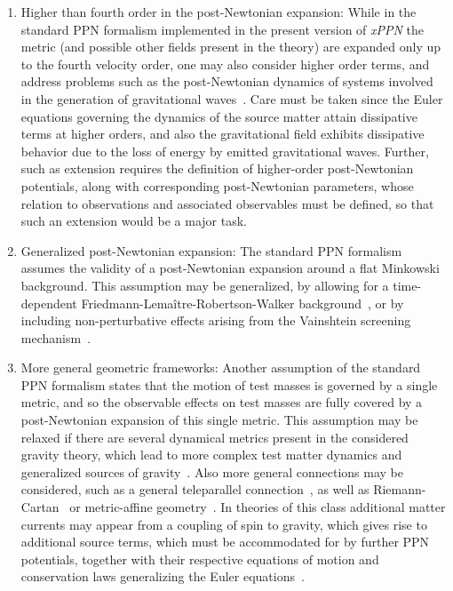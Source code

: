 \documentclass[notitlepage,a4paper,aps,prd,onecolumn,superscriptaddress,nofootinbib,groupedaddress,longbibliography]{revtex4-1}
\newcommand{\xPPN}{\emph{xPPN}}
\begin{document}
\begin{enumerate}
\item
Higher than fourth order in the post-Newtonian expansion: While in the standard PPN formalism implemented in the present version of \xPPN{} the metric (and possible other fields present in the theory) are expanded only up to the fourth velocity order, one may also consider higher order terms, and address problems such as the post-Newtonian dynamics of systems involved in the generation of gravitational waves~\cite{Blanchet:2013haa,Will:2018bme}. Care must be taken since the Euler equations governing the dynamics of the source matter attain dissipative terms at higher orders, and also the gravitational field exhibits dissipative behavior due to the loss of energy by emitted gravitational waves. Further, such as extension requires the definition of higher-order post-Newtonian potentials, along with corresponding post-Newtonian parameters, whose relation to observations and associated observables must be defined, so that such an extension would be a major task.

\item
Generalized post-Newtonian expansion: The standard PPN formalism assumes the validity of a post-Newtonian expansion around a flat Minkowski background. This assumption may be generalized, by allowing for a time-dependent Friedmann-Lemaître-Robertson-Walker background~\cite{Sanghai:2016tbi}, or by including non-perturbative effects arising from the Vainshtein screening mechanism~\cite{Avilez-Lopez:2015dja}.

\item
More general geometric frameworks: Another assumption of the standard PPN formalism states that the motion of test masses is governed by a single metric, and so the observable effects on test masses are fully covered by a post-Newtonian expansion of this single metric. This assumption may be relaxed if there are several dynamical metrics present in the considered gravity theory, which lead to more complex test matter dynamics and generalized sources of gravity~\cite{Clifton:2010hz,Hohmann:2010ni,Hohmann:2013oca}. Also more general connections may be considered, such as a general teleparallel connection~\cite{Jimenez:2019ghw}, as well as Riemann-Cartan~\cite{Smalley:1980em,Castagnino:1985,Castagnino:1987,Gladchenko:1990nw,Gladchenko:1994wu} or metric-affine geometry~\cite{Hehl:1994ue}. In theories of this class additional matter currents may appear from a coupling of spin to gravity, which gives rise to additional source terms, which must be accommodated for by further PPN potentials, together with their respective equations of motion and conservation laws generalizing the Euler equations~\cite{Weyssenhoff:1947iua,Ray:1982qr,Kopczynski:1986ep,Obukhov:1987yu,Obukhov:1993pt,Obukhov:1996mg,Puetzfeld:2014qba,Iosifidis:2020gth}.
\end{enumerate}
\end{document}
